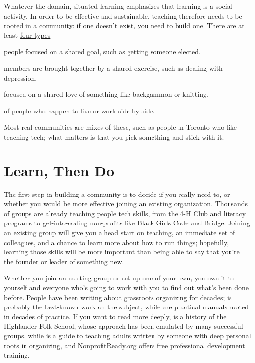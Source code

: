 Whatever the domain, situated learning emphasizes that learning is a
social activity. In order to be effective and sustainable, teaching
therefore needs to be rooted in a community; if one doesn't exist, you
need to build one. There are at least \href{https://www.feverbee.com/types-of-community-and-activity-within-the-community/}{four types}:

\begin{description}
\tightlist
\item[Community of action:]
people focused on a shared goal, such as getting someone elected.
\item[Community of concern:]
members are brought together by a shared exercise, such as dealing
with depression.
\item[Community of interest:]
focused on a shared love of something like backgammon or knitting.
\item[Community of place:]
of people who happen to live or work side by side.
\end{description}

Most real communities are mixes of these, such as people in Toronto who
like teaching tech; what matters is that you pick something and stick
with it.

\section{Learn, Then Do}\label{s:community-learn-then-do}

The first step in building a community is to decide if you really need
to, or whether you would be more effective joining an existing
organization. Thousands of groups are already teaching people tech
skills, from the \href{http://www.4-h-canada.ca/}{4-H Club} and \href{https://www.frontiercollege.ca/}{literacy
programs} to get-into-coding non-profits like \href{http://www.blackgirlscode.com/}{Black
Girls Code} and \href{http://bridgeschool.io/}{Bridge}. Joining an
existing group will give you a head start on teaching, an immediate
set of colleagues, and a chance to learn more about how to run things;
hopefully, learning those skills will be more important than being
able to say that you're the founder or leader of something new.

Whether you join an existing group or set up one of your own, you owe
it to yourself and everyone who's going to work with you to find out
what's been done before. People have been writing about grassroots
organizing for decades; \cite{Alin1989} is probably the best-known
work on the subject, while \cite{Brow2007,Midw2010} are
practical manuals rooted in decades of practice. If you want to read
more deeply, \cite{Adam1975} is a history of the Highlander Folk
School, whose approach has been emulated by many successful groups,
while \cite{Spal2014} is a guide to teaching adults written by
someone with deep personal roots in organizing, and
\href{https://www.nonprofitready.org/}{NonprofitReady.org} offers free professional
development training.

